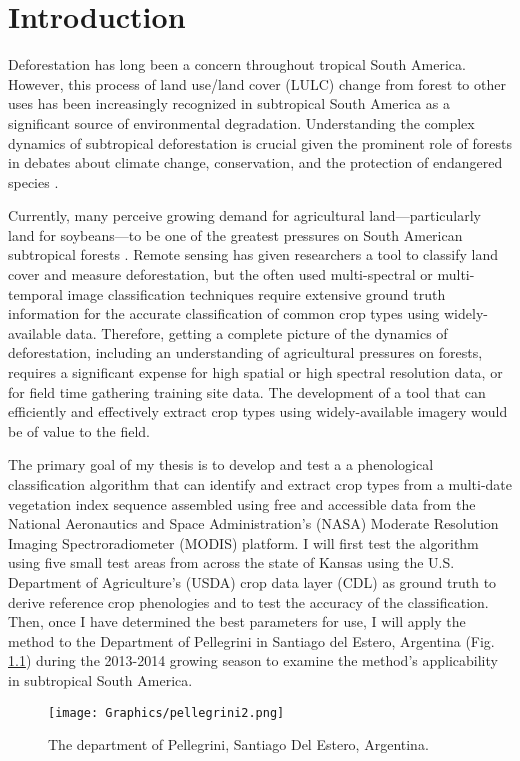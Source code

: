 \chapter{Introduction}

Deforestation has long been a concern throughout tropical South America. However, this process of land use/land cover (LULC) change from forest to other uses has been increasingly recognized in subtropical South America as a significant source of environmental degradation. Understanding the complex dynamics of subtropical deforestation is crucial given the prominent role of forests in debates about climate change, conservation, and the protection of endangered species \autocites{geist2002proximate}{zak2004do-subtropical}{bonnie2000counting}{houghton1994the-worldwide}{sala2000global}.

Currently, many perceive growing demand for agricultural land---particularly land for soybeans---to be one of the greatest pressures on South American subtropical forests \autocites{pengue2005transgenic}{grau2005agriculture}{altieri2006gm-soybean:}. Remote sensing has given researchers a tool to classify land cover and measure deforestation, but the often used multi-spectral or multi-temporal image classification techniques require extensive ground truth information for the accurate classification of common crop types using widely-available data. Therefore, getting a complete picture of the dynamics of deforestation, including an understanding of agricultural pressures on forests, requires a significant expense for high spatial or high spectral resolution data, or for field time gathering training site data. The development of a tool that can efficiently and effectively extract crop types using widely-available imagery would be of value to the field.

The primary goal of my thesis is to develop and test a a phenological classification algorithm that can identify and extract crop types from a multi-date vegetation index sequence assembled using free and accessible data from the National Aeronautics and Space Administration’s (NASA) Moderate Resolution Imaging Spectroradiometer (MODIS) platform. I will first test the algorithm using five small test areas from across the state of Kansas using the U.S. Department of Agriculture's (USDA) crop data layer (CDL) as ground truth to derive reference crop phenologies and to test the accuracy of the classification. Then, once I have determined the best parameters for use, I will apply the method to the Department of Pellegrini in Santiago del Estero, Argentina (Fig. \ref{fig:pellegrini}) during the 2013-2014 growing season to examine the method's applicability in subtropical South America.

\begin{figure}[H]
  \centering
  \texttt{[image: Graphics/pellegrini2.png]}
  \caption{The department of Pellegrini, Santiago Del Estero, Argentina.}
  \label{fig:pellegrini}
\end{figure}
